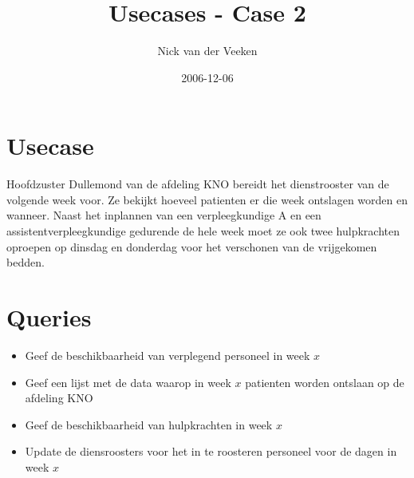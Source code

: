 \documentclass[]{article}
\title{Usecases - Case 2}
\author{Nick van der Veeken}
\date{2006-12-06}
\begin{document}
\ifpdf
{}
\else
{}
\fi

\maketitle


\begin{abstract}
\end{abstract}

\section{Usecase}

Hoofdzuster Dullemond van de afdeling KNO bereidt het dienstrooster
van de volgende week voor. Ze bekijkt hoeveel patienten er die week
ontslagen worden en wanneer. Naast het inplannen van een
verpleegkundige A en een assistentverpleegkundige gedurende de hele
week moet ze ook twee hulpkrachten oproepen op dinsdag en donderdag
voor het verschonen van de vrijgekomen bedden.

\section{Queries}

\begin{itemize}
  \item Geef de beschikbaarheid van verplegend personeel in week $x$
  \item Geef een lijst met de data waarop in week $x$ patienten worden
  ontslaan op de afdeling KNO
  \item Geef de beschikbaarheid van hulpkrachten in week $x$
  \item Update de diensroosters voor het in te roosteren personeel voor de dagen in week $x$
\end{itemize}


\end{document}
